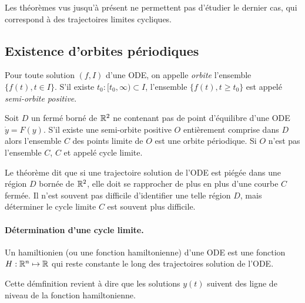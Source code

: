 Les théorèmes vus jusqu'à présent ne permettent pas d'étudier le dernier cas, qui correspond à des trajectoires limites cycliques.

\subsection{Existence d'orbites périodiques} 

\begin{definition}[Orbite]
  Pour toute solution $(f, I)$ d'une ODE, on appelle \emph{orbite} l'ensemble $\{f(t), t \in I\}$. S'il existe $t_0: [t_0, \infty) \subset I$, l'ensemble $\{f(t), t \geq t_0\}$ est appelé \emph{semi-orbite positive}.
\end{definition}

\begin{theorem}
  Soit $D$ un fermé borné de $\mathbb{R}^2$ ne contenant pas de point d'équilibre d'une ODE $\dot y = F(y)$. S'il existe une semi-orbite positive $O$ entièrement comprise dans $D$ alors l'ensemble $C$ des points limite de $O$ est une orbite périodique. Si $O$ n'est pas l'ensemble $C$, $C$ et appelé cycle limite.
\end{theorem}

\remark
Le théorème dit que si une trajectoire solution de l'ODE est piégée dans une région $D$ bornée de $\mathbb{R}^2$, elle doit se rapprocher de plus en plus d'une courbe $C$ fermée. Il n'est souvent pas difficile d'identifier une telle région $D$, mais déterminer le cycle limite $C$ est souvent plus difficile.

\paragraph*{Détermination d'une cycle limite.} 

\begin{definition}[Hamiltionien]
  Un hamiltionien (ou une fonction hamiltonienne) d'une ODE est une fonction $H : \mathbb{R}^n \mapsto \mathbb{R}$ qui reste constante le long des trajectoires solution de l'ODE.
\end{definition}

\remark
Cette démfinition revient à dire que les solutions $y(t)$ suivent des ligne de niveau de la fonction hamiltonienne.

